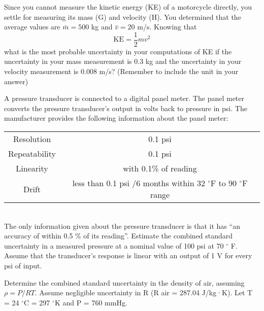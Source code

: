 \documentclass[a4paper,11pt,dvipsnames]{book}
\begin{document}
\begin{question}
Since you cannot measure the kinetic energy (KE) of a motorcycle directly, you settle for measuring its mass (G) and velocity (H). You determined that the average values are $\bar{m} = 500$ kg and $\bar{v} = 20$ m/s. 
Knowing that 
\begin{equation}
\text{KE} = \frac{1}{2} m v^2
\end{equation}
what is the most probable uncertainty in your computations of KE if the uncertainty in your
mass measurement is 0.3 kg and the uncertainty in your velocity measurement is 0.008 m/s?
(Remember to include the unit in your answer)
\end{question}

\begin{solution}
\examspace*{10em}


\end{solution}


\begin{question}
A pressure transducer is connected to a digital panel meter. The panel meter converts the pressure transducer’s output in volts back to pressure in psi. The manufacturer provides the following information about the panel meter: \\
\begin{tabular}{|cc|}
\hline 
Resolution & 0.1 psi \\ 
Repeatability & 0.1 psi \\ 
Linearity & with 0.1\% of reading \\ 
Drift & less than 0.1 psi /6 months within 32 $^{\circ}$F to 90 $^{\circ}$F range  \\ 
\hline 
\end{tabular} \\

The only information given about the pressure transducer is that it has “an accuracy
of within 0.5 \% of its reading”. Estimate the combined standard uncertainty in a measured pressure at a nominal
value of 100 psi at 70 $^{\circ}$ F. Assume that the transducer’s response is linear with an output of 1 V for every psi of input.
\end{question}

\begin{solution}

\examspace*{10em}

\end{solution}



\begin{question}
Determine the combined standard uncertainty in the density of air,
assuming $\rho = P/RT$. Assume negligible uncertainty in R (R air = 287.04 J/kg·K). Let
T = 24 $^{\circ}$C = 297 $^{\circ}$K and P = 760 mmHg.

\end{question}
\begin{solution}

\examspace*{10em}

\end{solution}
\end{document}
